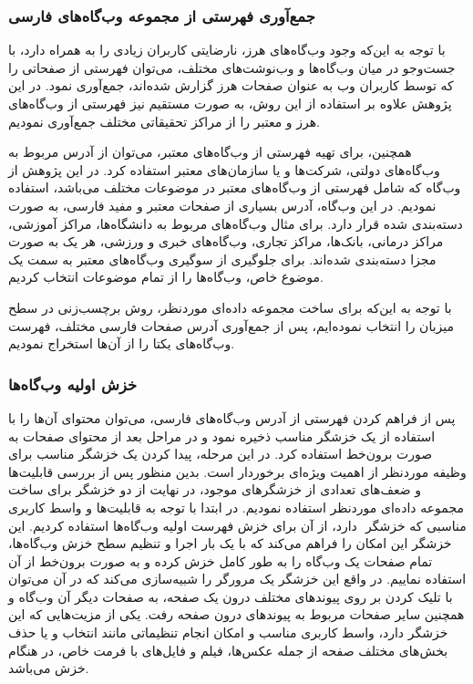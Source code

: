 \documentclass[twoside, a4paper,11pt]{book}
\numberwithin{equation}{chapter}
\numberwithin{table}{chapter}
\numberwithin{figure}{chapter}
\numberwithin{equation}{chapter}
\begin{document}
\subsubsection{جمع‌آوری فهرستی از مجموعه وب‌گاه‌های فارسی}
با توجه به این‌که وجود وب‌گاه‌های هرز، نارضایتی کاربران زیادی را به همراه دارد، با جست‌و‌جو در میان وب‌گاه‌ها و وب‌نوشت‌های مختلف، می‌توان فهرستی از صفحاتی را که توسط کاربران وب به عنوان صفحات هرز گزارش شده‌اند، جمع‌آوری نمود. در این پژوهش علاوه بر استفاده از این روش، به صورت مستقیم نیز  فهرستی  از وب‌گاه‌های هرز و معتبر را از مراکز تحقیقاتی مختلف جمع‌آوری نمودیم. 

همچنین، برای تهیه فهرستی از وب‌گاه‌های معتبر، می‌توان از آدرس مربوط به وب‌گاه‌های دولتی،  شرکت‌ها و یا سازمان‌های معتبر استفاده کرد. در این پژوهش از وب‌گاه‌  که شامل فهرستی از وب‌گاه‌های معتبر در موضوعات مختلف می‌باشد، استفاده نمودیم. در این وب‌گاه، آدرس بسیاری از صفحات معتبر و مفید فارسی، به صورت دسته‌بندی شده قرار دارد. برای مثال وب‌گاه‌های مربوط به دانشگاه‌ها، مراکز آموزشی، مراکز درمانی، بانک‌ها، مراکز تجاری، وب‌گاه‌های خبری و ورزشی، هر یک به صورت مجزا دسته‌بندی شده‌اند. برای جلوگیری از سوگیری وب‌گاه‌های معتبر به سمت یک موضوع خاص، وب‌گاه‌ها را از تمام موضوعات انتخاب کردیم.

با توجه به این‌که برای ساخت مجموعه داده‌ای موردنظر، روش برچسب‌زنی در سطح میزبان را انتخاب نموده‌ایم، پس از جمع‌آوری آدرس صفحات فارسی مختلف، فهرست وب‌گاه‌های یکتا را از آن‌ها استخراج نمودیم. 

\subsubsection{خزش اولیه وب‌گاه‌ها}
پس از فراهم کردن فهرستی از آدرس وب‌گاه‌های فارسی، می‌توان محتوای آن‌‌ها را  با استفاده از یک خزشگر مناسب ذخیره نمود و در مراحل بعد از محتوای صفحات  به صورت برون‌خط استفاده کرد. در این مرحله، پیدا کردن یک خزشگر مناسب برای  وظیفه موردنظر از اهمیت ویژه‌ای برخوردار است. بدین منظور پس از بررسی قابلیت‌ها و ضعف‌های تعدادی از خزشگرهای موجود، در نهایت از دو خزشگر برای ساخت مجموعه داده‌ای موردنظر استفاده نمودیم. 
در ابتدا با توجه به قابلیت‌ها و واسط کاربری مناسبی که خزشگر ‌ دارد، از آن برای خزش فهرست اولیه وب‌گاه‌ها استفاده کردیم. این خزشگر این امکان را فراهم می‌کند که با یک بار اجرا و تنظیم سطح خزش وب‌گاه‌ها، تمام صفحات یک وب‌گاه را به طور کامل خزش کرده و به صورت برون‌خط از آن استفاده نماییم. در واقع این خزشگر  یک مرورگر را شبیه‌سازی می‌کند که در آن می‌توان با تلیک کردن بر روی پیوندهای مختلف درون یک صفحه، به صفحات دیگر آن وب‌گاه و همچنین سایر صفحات مربوط به پیوندهای درون صفحه رفت. یکی از مزیت‌‌هایی که این خزشگر دارد، واسط کاربری مناسب و امکان انجام تنظیماتی مانند انتخاب و یا حذف بخش‌های مختلف صفحه از جمله عکس‌ها، فیلم و فایل‌های با فرمت خاص، در هنگام خزش می‌باشد.
\end{document}
